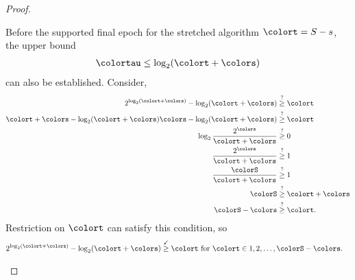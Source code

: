 \begin{proof}
\begin{proofpart}
Before the supported final epoch for the stretched algorithm $\colort = S - s$, the upper bound
\begin{align}
\colortau \leq \log_2(\colort + \colors) \label{eqn:meta-epoch-bound-large}
\end{align}
can also be established.
Consider,
\begin{align*}
2^{\log_{2}(\colort + \colors)} - \log_2(\colort + \colors)
&\stackrel{?}{\geq} \colort\\
\colort + \colors - \log_2(\colort + \colors)
\colors - \log_2(\colort + \colors)
&\stackrel{?}{\geq} \colort\\
\log_2\frac{2^{\colors}}{\colort + \colors}
&\stackrel{?}{\geq} 0\\
\frac{2^{\colors}}{\colort + \colors}
&\stackrel{?}{\geq} 1\\
\frac{\colorS}{\colort + \colors}
&\stackrel{?}{\geq} 1\\
\colorS
&\stackrel{?}{\geq} \colort + \colors\\
\colorS - \colors &\stackrel{?}{\geq} \colort.
\end{align*}
Restriction on $\colort$ can satisfy this condition, so
\begin{align*}
2^{\log_{2}(\colort + \colors)} - \log_2(\colort + \colors)
&\stackrel{\checkmark}{\geq} \colort \text{ for } \colort \in 1, 2, \ldots, \colorS - \colors.
\end{align*}
\end{proofpart}
\end{proof}
